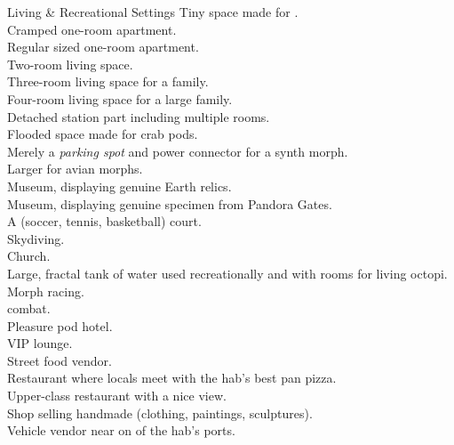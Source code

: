 \begin{tableone}{Living \& Recreational Settings}
Tiny space made for .\\
Cramped one-room apartment.\\
Regular sized one-room apartment.\\
Two-room living space.\\
Three-room living space for a family.\\
Four-room living space for a large family.\\
Detached station part including multiple rooms.\\
Flooded space made for crab pods.\\
Merely a \textit{parking spot} and power connector for a synth morph.\\
Larger  for avian morphs.\\
Museum, displaying genuine Earth relics.\\
Museum, displaying genuine specimen from Pandora Gates.\\
A (soccer, tennis, basketball) court.\\
Skydiving.\\
Church.\\
Large, fractal tank of water used recreationally and with rooms for living octopi.\\
Morph racing.\\
 combat.\\
Pleasure pod hotel.\\
VIP lounge.\\
Street food vendor.\\
Restaurant where locals meet with the hab's best pan pizza.\\
Upper-class restaurant with a nice view.\\
Shop selling handmade (clothing, paintings, sculptures).\\
Vehicle vendor near on of the hab's ports.\\
\end{tableone}


